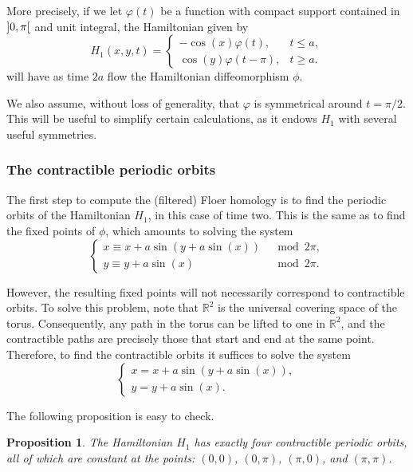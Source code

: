 \documentclass{article}
\newtheorem{prop}{Proposition}
\theoremstyle{nonumberplain}
\newcommand{\R}{\mathbb{R}}
\begin{document}
More precisely, if we let $\varphi(t)$ be a function with compact support contained in $\ointerval 0 \pi$ and unit integral, the Hamiltonian given by
\begin{equation}
H_1(x,y,t) = \begin{cases}
-\cos(x) \varphi(t), & t \leq a,\\
\cos(y) \varphi(t-\pi), & t \geq a.
\end{cases}
\end{equation}
will have as time $2a$	 flow the Hamiltonian diffeomorphism $\phi$.

We also assume, without loss of generality, that $\varphi$ is symmetrical around $t = \pi/2$. This will be useful to simplify certain calculations, as it endows $H_1$ with several useful symmetries.

\subsubsection{The contractible periodic orbits}

The first step to compute the (filtered) Floer homology is to find the periodic orbits of the Hamiltonian $H_1$, in this case of time two. This is the same as to find the fixed points of $\phi$, which amounts to solving the system
\begin{equation}
\begin{cases}
x \equiv x + a \sin(y + a \sin(x)) &\mod 2\pi,\\
y \equiv y + a \sin(x) &\mod 2\pi.
\end{cases}
\end{equation}

However, the resulting fixed points will not necessarily correspond to contractible orbits. To solve this problem, note that $\R^2$ is the universal covering space of the torus. Consequently, any path in the torus can be lifted to one in $\R^2$, and the contractible paths are precisely those that start and end at the same point. Therefore, to find the contractible orbits it suffices to solve the system
\begin{equation}
\begin{cases}
x = x + a \sin(y + a \sin(x)),\\
y = y + a \sin(x).
\end{cases}
\end{equation}

The following proposition is easy to check.

\begin{prop}
The Hamiltonian $H_1$ has exactly four contractible periodic orbits, all of which are constant at the points: $(0,0)$, $(0,\pi)$, $(\pi,0)$, and $(\pi,\pi)$.
\end{prop}
\end{document}
